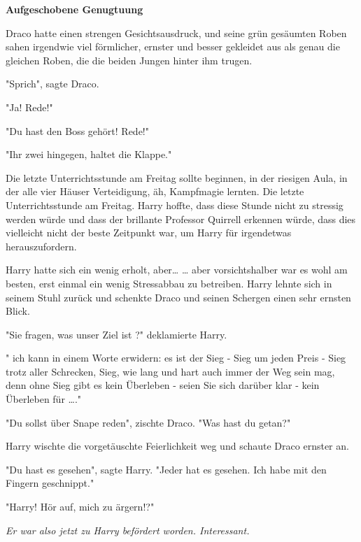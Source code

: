 

\hypertarget{aufgeschobene-genugtuung}{%

\textbf{Aufgeschobene Genugtuung}

Draco hatte einen strengen Gesichtsausdruck, und seine grün gesäumten Roben sahen irgendwie viel förmlicher, ernster und besser gekleidet aus als genau die gleichen Roben, die die beiden Jungen hinter ihm trugen.

"Sprich", sagte Draco.

"Ja! Rede!"

"Du hast den Boss gehört! Rede!"

"Ihr zwei hingegen, haltet die Klappe."

Die letzte Unterrichtsstunde am Freitag sollte beginnen, in der riesigen Aula, in der alle vier Häuser Verteidigung, äh, Kampfmagie lernten. Die letzte Unterrichtsstunde am Freitag. Harry hoffte, dass diese Stunde nicht zu stressig werden würde und dass der brillante Professor Quirrell erkennen würde, dass dies vielleicht nicht der beste Zeitpunkt war, um Harry für irgendetwas herauszufordern.

Harry hatte sich ein wenig erholt, aber… … aber vorsichtshalber war es wohl am besten, erst einmal ein wenig Stressabbau zu betreiben. Harry lehnte sich in seinem Stuhl zurück und schenkte Draco und seinen Schergen einen sehr ernsten Blick.

"Sie fragen, was unser Ziel ist ?" deklamierte Harry.

" ich kann in einem Worte erwidern: es ist der Sieg - Sieg um jeden Preis - Sieg trotz aller Schrecken, Sieg, wie lang und hart auch immer der Weg sein mag, denn ohne Sieg gibt es kein Überleben - seien Sie sich darüber klar - kein Überleben für …."

"Du sollst über Snape reden", zischte Draco. "Was hast du getan?"

Harry wischte die vorgetäuschte Feierlichkeit weg und schaute Draco ernster an.

"Du hast es gesehen", sagte Harry. "Jeder hat es gesehen. Ich habe mit den Fingern geschnippt."

"Harry! Hör auf, mich zu ärgern!?"

\emph{Er war also jetzt zu Harry befördert worden. Interessant.}

}
